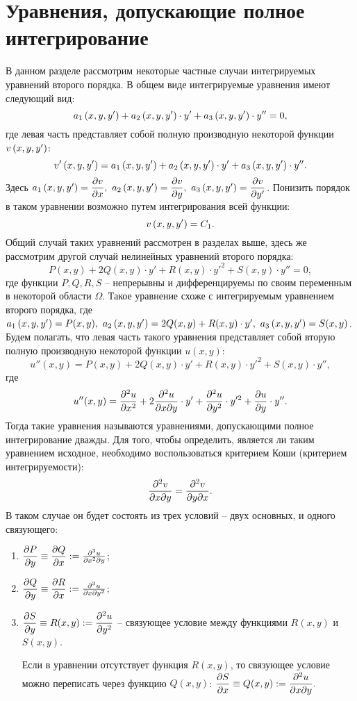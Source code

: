\section{Уравнения, допускающие полное интегрирование}

	В данном разделе рассмотрим некоторые частные случаи интегрируемых уравнений второго порядка. В общем виде интегрируемые уравнения имеют следующий вид:
	\[ a_1 \left( x, y, y' \right) + a_2 \left( x, y, y' \right) \cdot y' + a_3 \left( x, y, y' \right) \cdot y'' = 0, \]
	где левая часть представляет собой полную производную некоторой функции $v\left( x, y, y' \right)$:
	\[ v'\left( x, y, y' \right) = a_1 \left( x, y, y' \right) + a_2 \left( x, y, y' \right) \cdot y' + a_3 \left( x, y, y' \right) \cdot y''. \]
	Здесь \( a_1 \left( x, y, y' \right) = \dfrac{\partial v}{\partial x}, ~ a_2 \left( x, y, y' \right) = \dfrac{\partial v}{\partial y}, ~ a_3 \left( x, y, y' \right) = \dfrac{\partial v}{\partial y'} \). Понизить порядок в таком уравнении возможно путем интегрирования всей функции:
	\[ v \left( x, y, y' \right) = C_1. \]
	Общий случай таких уравнений рассмотрен в разделах выше, здесь же рассмотрим другой случай нелинейных уравнений второго порядка:
	\[ P(x, y) + 2 Q(x, y) \cdot y' + R(x, y) \cdot y'^2 + S(x, y) \cdot y'' = 0, \]
	где функции $P, Q, R, S$ -- непрерывны и дифференцируемы по своим переменным в некоторой области $\Omega$. Такое уравнение схоже с интегрируемым уравнением второго порядка, где \( a_1 \left( x, y, y' \right) = P(x, y), ~ a_2 \left( x, y, y' \right) = 2Q(x, y) + R(x, y) \cdot y', ~ a_3 \left( x, y, y' \right) = S(x, y) \). Будем полагать, что левая часть такого уравнения представляет собой вторую полную производную некоторой функции $u(x, y)$:
	\[ u''(x, y) = P(x, y) + 2 Q(x, y) \cdot y' + R(x, y) \cdot y'^2 + S(x, y) \cdot y'', \]
	где
	\[ u''(x, y) = \dfrac{\partial^{2} u}{\partial x^{2}} + 2 \dfrac{\partial^2 u}{\partial x \partial y} \cdot y' + \dfrac{\partial^{2} u}{\partial y^{2}} \cdot y'^2 + \dfrac{\partial u}{\partial y} \cdot y''. \]
	Тогда такие уравнения называются уравнениями, допускающими полное интегрирование дважды. Для того, чтобы определить, является ли таким уравнением исходное, необходимо воспользоваться критерием Коши (критерием интегрируемости): 
	\[ \dfrac{\partial^2 v}{\partial x \partial y} = \dfrac{\partial^2 v}{\partial y \partial x}. \]
	В таком случае он будет состоять из трех условий -- двух основных, и одного связующего:
	\begin{enumerate}
		\item \( \dfrac{\partial P}{\partial y} \equiv \dfrac{\partial Q}{\partial x} := \frac{\partial^3 u}{\partial x^2 \partial y} \);
		\item \( \dfrac{\partial Q}{\partial y} \equiv \dfrac{\partial R}{\partial x} := \frac{\partial^3 u}{\partial x \partial y^2} \);
		\item \( \dfrac{\partial S}{\partial y} \equiv R(x, y) := \dfrac{\partial^{2} u}{\partial y^{2}} \) -- связующее условие между функциями $R(x, y)$ и $S(x, y)$. 

		Если в уравнении отсутствует функция $R(x, y)$, то связующее условие можно переписать через функцию $Q(x, y)$:
		\( \dfrac{\partial S}{\partial x} \equiv Q(x, y) := \dfrac{\partial^2 u}{\partial x \partial y}. \)
	\end{enumerate}

